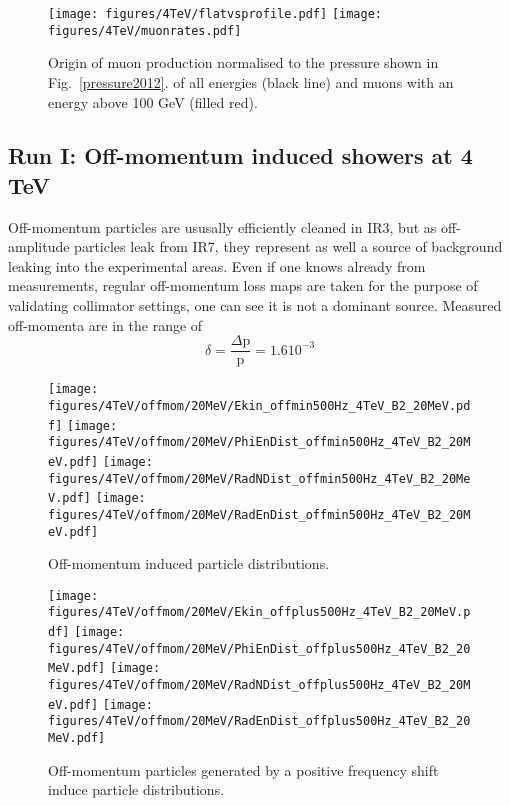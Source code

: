 \begin{figure}[!htb]
\begin{center}
  \texttt{[image: figures/4TeV/flatvsprofile.pdf]}
  \texttt{[image: figures/4TeV/muonrates.pdf]}
\end{center}
\vspace{-0.6cm}
 \caption{Origin of muon production normalised to the pressure shown in Fig.~\ref{pressure2012}. of all energies (black line) and muons with an energy above 100 GeV (filled red).
  \label{normed}}
\end{figure}
\subsection{Run I: Off-momentum induced showers at 4 TeV}

Off-momentum particles are ususally efficiently cleaned in IR3, but as off-amplitude particles leak from IR7, they represent as well a source of background leaking into the experimental areas. Even if one knows already from measurements, regular off-momentum loss maps are taken for the purpose of validating collimator settings, one can see it is not a dominant source. Measured off-momenta are in the range of
\begin{equation}
  \delta = \frac{\Delta \mathrm{p}}{\mathrm{p}} = 1.6 10^{-3}
\end{equation}

\begin{figure}[!htb]
\begin{center}
  \texttt{[image: figures/4TeV/offmom/20MeV/Ekin\_offmin500Hz\_4TeV\_B2\_20MeV.pdf]}
  \texttt{[image: figures/4TeV/offmom/20MeV/PhiEnDist\_offmin500Hz\_4TeV\_B2\_20MeV.pdf]}
  \texttt{[image: figures/4TeV/offmom/20MeV/RadNDist\_offmin500Hz\_4TeV\_B2\_20MeV.pdf]}
  \texttt{[image: figures/4TeV/offmom/20MeV/RadEnDist\_offmin500Hz\_4TeV\_B2\_20MeV.pdf]}
\end{center}
\vspace{-0.6cm}
 \caption{Off-momentum induced particle distributions.
  \label{offmom4TeV}}
\end{figure}

\begin{figure}[!htb]
\begin{center}
  \texttt{[image: figures/4TeV/offmom/20MeV/Ekin\_offplus500Hz\_4TeV\_B2\_20MeV.pdf]}
  \texttt{[image: figures/4TeV/offmom/20MeV/PhiEnDist\_offplus500Hz\_4TeV\_B2\_20MeV.pdf]}
  \texttt{[image: figures/4TeV/offmom/20MeV/RadNDist\_offplus500Hz\_4TeV\_B2\_20MeV.pdf]}
  \texttt{[image: figures/4TeV/offmom/20MeV/RadEnDist\_offplus500Hz\_4TeV\_B2\_20MeV.pdf]}
\end{center}
\vspace{-0.6cm}
 \caption{Off-momentum particles generated by a positive frequency shift induce particle distributions.
  \label{offmom4TeV}}
\end{figure}


